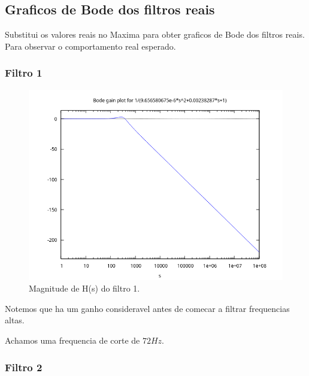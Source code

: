 \documentclass[12pt,twoside, a4paper, twocolumn]{article}
\begin{document}
\subsection{Graficos de Bode dos filtros reais}

Substitui os valores reais no Maxima para obter graficos de Bode dos filtros reais. Para observar o comportamento real esperado.

\subsubsection{Filtro 1}

\begin{figure}[h]
    \centering
    \includegraphics[width=1\columnwidth]{images/bodegainH1.png}
    \caption{Magnitude de H(s) do filtro 1.}
\end{figure}

Notemos que ha um ganho consideravel antes de comecar a filtrar frequencias altas.

Achamos uma frequencia de corte de $72Hz$.

\subsubsection{Filtro 2}
\end{document}
